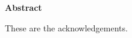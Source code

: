 \newenvironment{abstract}%
    {\cleardoublepage\thispagestyle{empty}\null\vfill\begin{center}%
    \bfseries Abstract\end{center}}%
    {\vfill\null}
        \begin{abstract}
        These are the acknowledgements.
        \end{abstract}
